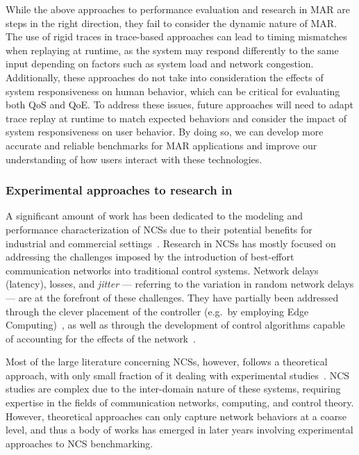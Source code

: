 While the above approaches to performance evaluation and research in \gls{MAR} are steps in the right direction, they fail to consider the dynamic nature of \gls{MAR}.
The use of rigid traces in trace-based approaches can lead to timing mismatches when replaying at runtime, as the system may respond differently to the same input depending on factors such as system load and network congestion.
Additionally, these approaches do not take into consideration the effects of system responsiveness on human behavior, which can be critical for evaluating both \gls{QoS} and \gls{QoE}.
To address these issues, future approaches will need to adapt trace replay at runtime to match expected behaviors and consider the impact of system responsiveness on user behavior.
By doing so, we can develop more accurate and reliable benchmarks for \gls{MAR} applications and improve our understanding of how users interact with these technologies.

\subsubsection{Experimental approaches to research in }

A significant amount of work has been dedicated to the modeling and performance characterization of \glspl{NCS} due to their potential benefits for industrial and commercial settings~\cite{lu2016real,hespanha2007survey,zhang2013network,zhang2016survey}.
Research in \glspl{NCS} has mostly focused on addressing the challenges imposed by the introduction of best-effort communication networks into traditional control systems.
Network delays (latency), losses, and \emph{jitter} --- referring to the variation in random network delays --- are at the forefront of these challenges.
They have partially been addressed through the clever placement of the controller (e.g.\ by employing Edge Computing)~\cite{sasaki2017layered,sasaki2016vehicle}, as well as through the development of control algorithms capable of accounting for the effects of the network~\cite{zhang2013network}.

Most of the large literature concerning \glspl{NCS}, however, follows a theoretical approach, with only small fraction of it dealing with experimental studies~\cite{zhang2019networked}.
\gls{NCS} studies are complex due to the inter-domain nature of these systems, requiring expertise in the fields of communication networks, computing, and control theory.
However, theoretical approaches can only capture network behaviors at a coarse level, and thus a body of works has emerged in later years involving experimental approaches to \gls{NCS} benchmarking.

